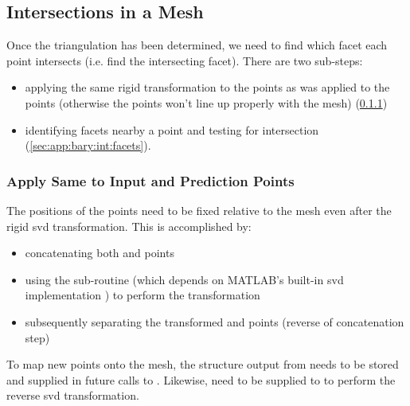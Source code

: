 \documentclass[final,twocolumn,12pt]{elsarticle}
\begin{document}
\begin{appendices}
\subsection{Intersections in a  Mesh}
\label{sec:app:bary:int}

Once the triangulation has been determined, we need to find which facet each \outpt{} point intersects (i.e. find the intersecting facet). There are two sub-steps:
\begin{itemize}
    \item[2.1] applying the same rigid transformation to the \outpt{} points as was applied to the \inpt{} points (otherwise the \outpt{} points won't line up properly with the mesh) (\cref{sec:app:bary:int:out-svd})
    \item[2.2] identifying facets nearby a \outpt{} point and testing for intersection (\cref{sec:app:bary:int:facets}).
\end{itemize}
\subsubsection{Apply Same  to Input and Prediction Points}
\label{sec:app:bary:int:out-svd}
The positions of the \outpt{} points need to be fixed relative to the mesh even after the rigid \gls{svd} transformation. %
This is accomplished by:
\begin{itemize}
    \item[2.1a] concatenating both \inpt{} and
\outpt{} points
    \item[2.1b] using the  sub-routine  (which depends on MATLAB's built-in \gls{svd} implementation ) to perform the transformation
    \item[2.1c] subsequently separating the transformed \inpt{} and \outpt{} points (reverse of concatenation step)
\end{itemize}

To map new points onto the mesh, the  structure output from  needs to be stored and supplied in future calls to . Likewise,  need to be supplied to  to perform the reverse \gls{svd} transformation.



\end{appendices}
\end{document}
